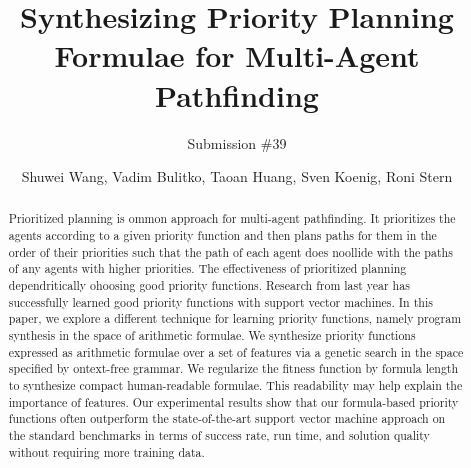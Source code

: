 \setcounter{secnumdepth}{2}

\title{Synthesizing Priority Planning Formulae for Multi-Agent Pathfinding}
\author{
Submission \#39
}
\author{
Shuwei Wang, Vadim Bulitko, Taoan Huang, Sven Koenig, Roni Stern
}



\maketitle

\begin{abstract}

Prioritized planning is ommon approach for multi-agent pathfinding. It prioritizes the agents according to a given priority function and then plans paths for them in the order of their priorities such that the path of each agent does noollide with the paths of any agents with higher priorities. The effectiveness of prioritized planning dependritically ohoosing good priority functions. Research from last year has successfully learned good priority functions with support vector machines. In this paper, we explore a different technique for learning priority functions, namely program synthesis in the space of arithmetic formulae. We synthesize priority functions expressed as arithmetic formulae over a set of features via a genetic search in the space specified by ontext-free grammar. We regularize the fitness function by formula length to synthesize compact human-readable formulae. This readability may help explain the importance of features. Our experimental results show that our formula-based priority functions often outperform the state-of-the-art support vector machine approach on the standard benchmarks in terms of success rate, run time, and solution quality without requiring more training data.

\end{abstract}

